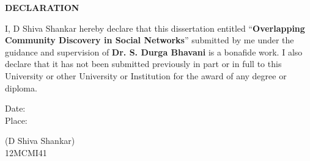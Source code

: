 \begin{center}
\textbf{\large DECLARATION}
\end{center}
\vspace{.50in}
I, D Shiva Shankar hereby declare that this dissertation entitled 
``\textbf{Overlapping Community Discovery in Social Networks}'' 
submitted by me under the guidance and supervision of \textbf{Dr. S. Durga Bhavani} is a bonafide work. 
I also declare that it has not been submitted previously in part or in full to this University or 
other University or Institution for the award of any degree or diploma.
\vspace{1in}

\noindent
\parbox[t]{3in}
{\raggedright
Date:\\
Place:\\
}
\parbox[t]{3in}
{
\raggedleft 
(D Shiva Shankar)\\
12MCMI41\\
}

